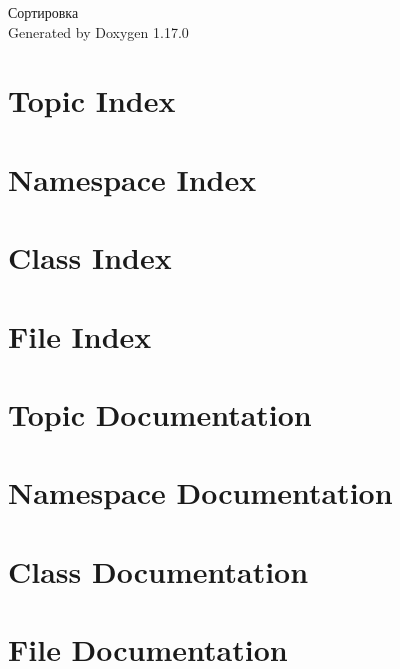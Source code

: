 \documentclass[twoside]{book}
\newcommand{\+}{\discretionary{\mbox{\scriptsize$\hookleftarrow$}}{}{}}
\newcommand{\clearemptydoublepage}{%
    \newpage{\pagestyle{empty}\cleardoublepage}%
  }
\begin{document}
  \raggedbottom
    \hypersetup{pageanchor=false,
                bookmarksnumbered=true,
                pdfencoding=unicode
               }
  \begin{titlepage}
  \vspace*{7cm}
  \begin{center}%
  {\Large Сортировка}\\
  \vspace*{1cm}
  {\large Generated by Doxygen 1.17.0}\\
  \end{center}
  \end{titlepage}
  \clearemptydoublepage
  \tableofcontents
  \clearemptydoublepage
  \hypersetup{pageanchor=true}
\chapter{Topic Index}

\chapter{Namespace Index}

\chapter{Class Index}

\chapter{File Index}

\chapter{Topic Documentation}




\chapter{Namespace Documentation}

\chapter{Class Documentation}

\chapter{File Documentation}



  \backmatter
  \newpage
  \clearemptydoublepage
  \printindex
\end{document}
